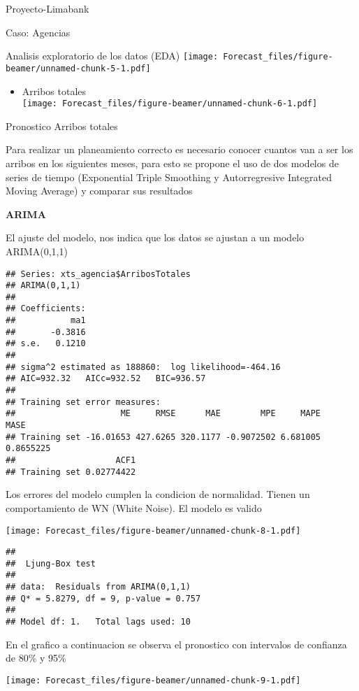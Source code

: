 \documentclass[
  ignorenonframetext,
]{beamer}
\providecommand{\tightlist}{%
  \setlength{\itemsep}{0pt}\setlength{\parskip}{0pt}}
\begin{document}
\begin{frame}[fragile]{Proyecto-Limabank}
\begin{block}{Caso: Agencias}
\begin{block}{Analisis exploratorio de los datos (EDA)}
\texttt{[image: Forecast\_files/figure-beamer/unnamed-chunk-5-1.pdf]}

\begin{itemize}
\tightlist
\item
  Arribos totales\\
  \texttt{[image: Forecast\_files/figure-beamer/unnamed-chunk-6-1.pdf]}
\end{itemize}

\end{block}

\begin{block}{Pronostico Arribos totales}

Para realizar un planeamiento correcto es necesario conocer cuantos van
a ser los arribos en los siguientes meses, para esto se propone el uso
de dos modelos de series de tiempo (Exponential Triple Smoothing y
Autorregresive Integrated Moving Average) y comparar sus resultados

\textbf{ARIMA}

El ajuste del modelo, nos indica que los datos se ajustan a un modelo
ARIMA(0,1,1)

\begin{verbatim}
## Series: xts_agencia$ArribosTotales 
## ARIMA(0,1,1) 
## 
## Coefficients:
##           ma1
##       -0.3816
## s.e.   0.1210
## 
## sigma^2 estimated as 188860:  log likelihood=-464.16
## AIC=932.32   AICc=932.52   BIC=936.57
## 
## Training set error measures:
##                     ME     RMSE      MAE        MPE     MAPE      MASE
## Training set -16.01653 427.6265 320.1177 -0.9072502 6.681005 0.8655225
##                    ACF1
## Training set 0.02774422
\end{verbatim}

Los errores del modelo cumplen la condicion de normalidad. Tienen un
comportamiento de WN (White Noise). El modelo es valido

\texttt{[image: Forecast\_files/figure-beamer/unnamed-chunk-8-1.pdf]}

\begin{verbatim}
## 
##  Ljung-Box test
## 
## data:  Residuals from ARIMA(0,1,1)
## Q* = 5.8279, df = 9, p-value = 0.757
## 
## Model df: 1.   Total lags used: 10
\end{verbatim}

En el grafico a continuacion se observa el pronostico con intervalos de
confianza de 80\% y 95\%

\texttt{[image: Forecast\_files/figure-beamer/unnamed-chunk-9-1.pdf]}


\end{block}
\end{block}
\end{frame}
\end{document}
